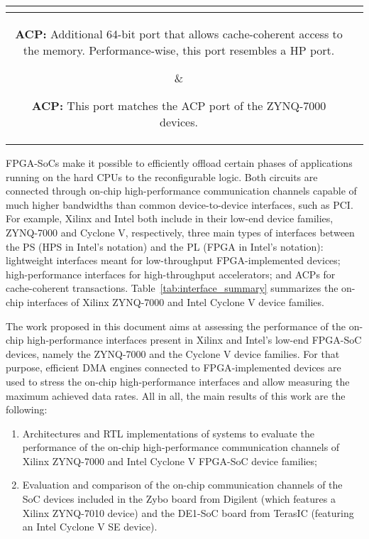 \begin{table}[!b]
\begin{tabular}{|c|c|}
{            \vspace{1mm} %
        } \\\hline %
        \parbox{.47\linewidth}{ %
            \vspace{1mm} %
            \textbf{\acf{ACP}:} Additional 64-bit port that allows cache-coherent access to the memory. Performance-wise, this port resembles a \ac{HP} port. %
            \vspace{1mm} %
        } & %
        \parbox{.47\linewidth}{ %
            \vspace{1mm} %
            \textbf{\acf{ACP}:} This port matches the \ac{ACP} port of the ZYNQ-7000 devices. %
            \vspace{1mm} %
        } \\\hline %
    \end{tabular} %
\end{table} %

\ac{FPGA}-\acp{SoC} make it possible to efficiently offload certain phases of applications running on the hard \acp{CPU} to the reconfigurable logic. Both circuits are connected through on-chip high-performance communication channels capable of much higher bandwidths than common device-to-device interfaces, such as \ac{PCI}. For example, Xilinx and Intel both include in their low-end device families, ZYNQ-7000 and Cyclone V, respectively, three main types of interfaces between the \ac{PS} (\ac{HPS} in Intel's notation) and the \ac{PL} (\ac{FPGA} in Intel's notation): lightweight interfaces meant for low-throughput \ac{FPGA}-implemented devices; high-performance interfaces for high-throughput accelerators; and \acfp{ACP} for cache-coherent transactions. Table~\ref{tab:interface_summary} summarizes the on-chip interfaces of Xilinx ZYNQ-7000 and Intel Cyclone V device families.

The work proposed in this document aims at assessing the performance of the on-chip high-performance interfaces present in Xilinx and Intel's low-end \ac{FPGA}-\ac{SoC} devices, namely the ZYNQ-7000 and the Cyclone V device families. For that purpose, efficient \ac{DMA} engines connected to \ac{FPGA}-implemented devices are used to stress the on-chip high-performance interfaces and allow measuring the maximum achieved data rates. All in all, the main results of this work are the following:
\begin{enumerate}[nosep]
    \item Architectures and \ac{RTL} implementations of systems to evaluate the performance of the on-chip high-performance communication channels of Xilinx ZYNQ-7000 and Intel Cyclone V \ac{FPGA}-\ac{SoC} device families;
    \item Evaluation and comparison of the on-chip communication channels of the \ac{SoC} devices included in the Zybo board from Digilent (which features a Xilinx ZYNQ-7010 device) and the DE1-\acs{SoC} board from TerasIC (featuring an Intel Cyclone V SE device).
\end{enumerate}


